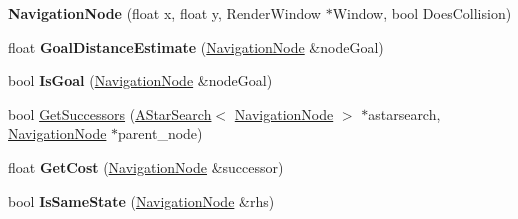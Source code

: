 \begin{DoxyCompactItemize}
\item 
\mbox{\label{struct_engine_1_1_core_1_1_navigation_node_a67ff011cd89aced43978f3f6265f6c63}} 
{\bfseries Navigation\+Node} (float x, float y, Render\+Window $\ast$Window, bool Does\+Collision)
\item 
\mbox{\label{struct_engine_1_1_core_1_1_navigation_node_acd420576ac7c916755d9c7a9908a6aad}} 
float {\bfseries Goal\+Distance\+Estimate} (\hyperlink{struct_engine_1_1_core_1_1_navigation_node}{Navigation\+Node} \&node\+Goal)
\item 
\mbox{\label{struct_engine_1_1_core_1_1_navigation_node_aa838e27a48677c1359fc1bab0b8a8591}} 
bool {\bfseries Is\+Goal} (\hyperlink{struct_engine_1_1_core_1_1_navigation_node}{Navigation\+Node} \&node\+Goal)
\item 
bool \hyperlink{struct_engine_1_1_core_1_1_navigation_node_a4e049fbcda1bb269303da91692d05033}{Get\+Successors} (\hyperlink{class_a_star_search}{A\+Star\+Search}$<$ \hyperlink{struct_engine_1_1_core_1_1_navigation_node}{Navigation\+Node} $>$ $\ast$astarsearch, \hyperlink{struct_engine_1_1_core_1_1_navigation_node}{Navigation\+Node} $\ast$parent\+\_\+node)
\item 
\mbox{\label{struct_engine_1_1_core_1_1_navigation_node_a2d2f49adb68c3b880b750875ad15a50b}} 
float {\bfseries Get\+Cost} (\hyperlink{struct_engine_1_1_core_1_1_navigation_node}{Navigation\+Node} \&successor)
\item 
\mbox{\label{struct_engine_1_1_core_1_1_navigation_node_ab265c716b1b82675c800f7027e0666d8}} 
bool {\bfseries Is\+Same\+State} (\hyperlink{struct_engine_1_1_core_1_1_navigation_node}{Navigation\+Node} \&rhs)
\end{DoxyCompactItemize}
